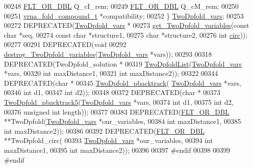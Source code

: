 \begin{DoxyCode}
00248   \hyperlink{group__data__structures_ga31125aeace516926bf7f251f759b6126}{FLT\_OR\_DBL}      Q\_cI\_rem;
00249   \hyperlink{group__data__structures_ga31125aeace516926bf7f251f759b6126}{FLT\_OR\_DBL}      Q\_cM\_rem;
00250 
00251   \hyperlink{group__fold__compound_structvrna__fc__s}{vrna\_fold\_compound\_t} *compatibility;
00252 \} \hyperlink{structTwoDpfold__vars}{TwoDpfold\_vars};
00253 
00272 DEPRECATED(\hyperlink{structTwoDpfold__vars}{TwoDpfold\_vars}  *
00273 \hyperlink{2Dpfold_8h_a1aca740e2a75ab2b2951538266e53d64}{get\_TwoDpfold\_variables}(\textcolor{keyword}{const} \textcolor{keywordtype}{char} *seq,
00274                         \textcolor{keyword}{const} \textcolor{keywordtype}{char} *structure1,
00275                         \textcolor{keywordtype}{char} *structure2,
00276                         \textcolor{keywordtype}{int} \hyperlink{group__model__details_gaf9202a1a09f5828dc731e2d9a10fa111}{circ}));
00277 
00291 DEPRECATED(\textcolor{keywordtype}{void} 
00292 \hyperlink{2Dpfold_8h_afe994291458ee2ac34d3eb825ef62a15}{destroy\_TwoDpfold\_variables}(\hyperlink{structTwoDpfold__vars}{TwoDpfold\_vars} *vars));
00293 
00318 DEPRECATED(TwoDpfold\_solution  *
00319 \hyperlink{2Dpfold_8h_a692243dac482a1e158a8e1b7881cfda2}{TwoDpfoldList}(\hyperlink{structTwoDpfold__vars}{TwoDpfold\_vars} *vars,
00320               \textcolor{keywordtype}{int} maxDistance1,
00321               \textcolor{keywordtype}{int} maxDistance2));
00322 
00344 DEPRECATED(\textcolor{keywordtype}{char} *
00345 \hyperlink{2Dpfold_8h_ae251288f50dd4ae7d315af0085775f71}{TwoDpfold\_pbacktrack}( \hyperlink{structTwoDpfold__vars}{TwoDpfold\_vars} *vars,
00346                       \textcolor{keywordtype}{int} d1,
00347                       \textcolor{keywordtype}{int} d2));
00348 
00372 DEPRECATED(\textcolor{keywordtype}{char} *
00373 \hyperlink{2Dpfold_8h_a13430ac6a7f90df426774f131647d2c7}{TwoDpfold\_pbacktrack5}(\hyperlink{structTwoDpfold__vars}{TwoDpfold\_vars} *vars,
00374                       \textcolor{keywordtype}{int} d1,
00375                       \textcolor{keywordtype}{int} d2,
00376                       \textcolor{keywordtype}{unsigned} \textcolor{keywordtype}{int} length));
00377 
00383 DEPRECATED(\hyperlink{group__data__structures_ga31125aeace516926bf7f251f759b6126}{FLT\_OR\_DBL}          **TwoDpfold(\hyperlink{structTwoDpfold__vars}{TwoDpfold\_vars} *our\_variables,
00384                                 \textcolor{keywordtype}{int} maxDistance1,
00385                                 \textcolor{keywordtype}{int} maxDistance2));
00386 
00392 DEPRECATED(\hyperlink{group__data__structures_ga31125aeace516926bf7f251f759b6126}{FLT\_OR\_DBL}          **TwoDpfold\_circ(
00393                                 \hyperlink{structTwoDpfold__vars}{TwoDpfold\_vars} *our\_variables,
00394                                 \textcolor{keywordtype}{int} maxDistance1,
00395                                 \textcolor{keywordtype}{int} maxDistance2));
00396 
00397 \textcolor{preprocessor}{#endif}
00398 
00399 \textcolor{preprocessor}{#endif}
\end{DoxyCode}

